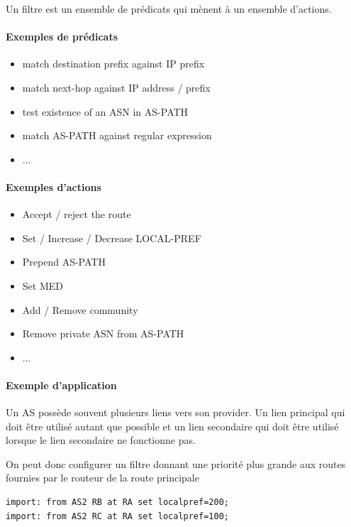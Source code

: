 \documentclass{article}
\begin{document}
\begin{sffamily}
Un filtre est un ensemble de prédicats qui mènent à un ensemble
d'actions.

\paragraph{Exemples de prédicats}

\begin{itemize}
\item match destination prefix against IP prefix
\item match next-hop against IP address / prefix
\item test existence of an ASN in AS-PATH
\item match AS-PATH against regular expression
\item ...
\end{itemize}

\paragraph{Exemples d'actions}

\begin{itemize}
\item Accept / reject the route
\item Set / Increase / Decrease LOCAL-PREF
\item Prepend AS-PATH
\item Set MED
\item Add / Remove community
\item Remove private ASN from AS-PATH
\item ...
\end{itemize}

\paragraph{Exemple d'application}

Un AS possède souvent plusieurs liens vers son provider. Un lien
principal qui doit être utilisé autant que possible et un lien
secondaire qui doit être utilisé lorsque le lien secondaire ne
fonctionne pas.

On peut donc configurer un filtre donnant une priorité plus grande aux
routes fournies par le routeur de la route principale

\begin{verbatim}
import: from AS2 RB at RA set localpref=200;
import: from AS2 RC at RA set localpref=100;
\end{verbatim}


\end{sffamily}
\end{document}
